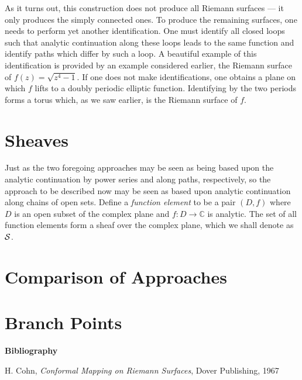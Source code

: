 \documentclass[12pt]{article}
\begin{document}
As it turns out, this construction does not produce all Riemann surfaces ---
it only produces the simply connected ones.  To produce the remaining
surfaces, one needs to perform yet another identification.  One must 
identify all closed loops such that analytic continuation along these
loops leads to the same function and identify paths which differ by such a
loop.  A beautiful example of this identification is provided by an example
considered earlier, the Riemann surface of $f(z) = \sqrt{z^4 - 1}$.  If
one does not make identifications, one obtains a plane on which $f$ lifts
to a doubly periodic elliptic function.  Identifying by the two periods
forms a torus which, as we saw earlier, is the Riemann surface of $f$.

\section{Sheaves}  Just as the two foregoing approaches may be seen as
being based upon the analytic continuation by power series and along
paths, respectively, so the approach to be described now may be seen as
based upon analytic continuation along chains of open sets.  Define a 
\emph{function element} to be a pair $(D,f)$ where $D$ is an open subset
of the complex plane and $f \colon D \to \mathbb{C}$ is analytic.  The
set of all function elements form a sheaf over the complex plane, which
we shall denote as ${\cal S}$.

\section{Comparison of Approaches}

\section{Branch Points}

{\bf Bibliography}

H. Cohn, \emph{Conformal Mapping on Riemann Surfaces}, Dover Publishing, 1967
\end{document}
